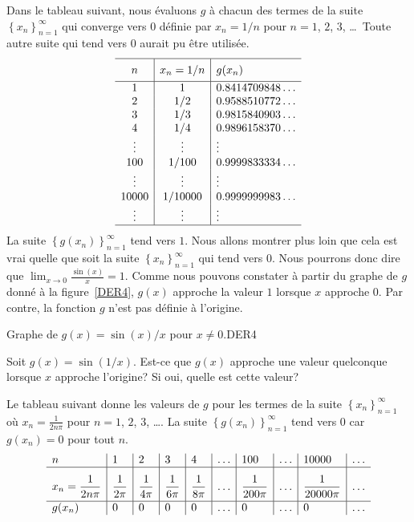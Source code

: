 {\begin{egg}
Dans le tableau suivant, nous évaluons $g$ à chacun des
termes de la suite $\displaystyle \left\{x_n\right\}_{n=1}^\infty$ qui
converge vers $0$ définie par $x_n = 1/n$ pour $n=1$, $2$, $3$,
\ldots\  Toute autre suite qui tend vers $0$ aurait pu être utilisée.
\[
\begin{array}{c|c|l}
\hline
\rule[-0.7em]{0ex}{2em} n & x_n = 1/n & g(x_n) \\
\hline
1 & 1 & 0.8414709848\ldots \\
2 & 1/2 & 0.9588510772\ldots \\
3 & 1/3 & 0.9815840903\ldots \\
4 & 1/4 & 0.9896158370\ldots \\
\vdots & \vdots & \vdots \\
100 & 1/100 & 0.9999833334\ldots \\
\vdots & \vdots & \vdots \\
10000 & 1/10000 & 0.9999999983\ldots \\
\vdots & \vdots & \vdots \\
\hline
\end{array}
\]
La suite $\displaystyle \left\{g(x_n)\right\}_{n=1}^\infty$
tend vers $1$.  Nous allons montrer plus loin que cela est vrai quelle que
soit la suite $\displaystyle \left\{x_n\right\}_{n=1}^\infty$ qui tend
vers $0$.  Nous pourrons donc dire que
$\displaystyle \lim_{x\rightarrow 0} \frac{\sin(x)}{x} = 1$.
Comme nous pouvons constater à partir du graphe de $g$ donné à la
figure~\ref{DER4}, $g(x)$ approche la valeur $1$ lorsque $x$ approche
$0$.  Par contre, la fonction $g$ n'est pas définie à l'origine.
\label{E_SINXX}
\end{egg}

{Graphe de $g(x) = \sin(x)/x$ pour $x\neq 0$.}{DER4}

\begin{egg}
Soit $g(x) = \sin(1/x)$.  Est-ce que $g(x)$ approche une valeur quelconque
lorsque $x$ approche l'origine?  Si oui, quelle est cette valeur?

Le tableau suivant donne les valeurs de $g$ pour les termes de la
suite $\displaystyle \left\{x_n\right\}_{n=1}^\infty$ où
$\displaystyle x_n = \frac{1}{2n \pi}$ pour $n=1$, $2$, $3$, \ldots.
La suite $\displaystyle \left\{g(x_n)\right\}_{n=1}^\infty$ tend
vers $0$ car $g(x_n) = 0$ pour tout $n$.
\[
\begin{array}{l|l|l|l|l|l|l|l|l|l}
n & 1 & 2 & 3 & 4 & \ldots & 100 & \ldots & 10000 & \ldots \\
\hline
\rule[-1em]{0ex}{3em} \displaystyle x_n = \frac{1}{2n \pi} &
\displaystyle \frac{1}{2\pi} & \displaystyle \frac{1}{4\pi} &
\displaystyle \frac{1}{6\pi} & \displaystyle \frac{1}{8\pi} &
\ldots & \displaystyle \frac{1}{200\pi} &
\ldots & \displaystyle \frac{1}{20000\pi} & \ldots \\
\hline
g(x_n) & 0 & 0 & 0 & 0 & \ldots & 0 & \ldots & 0 & \ldots
\end{array}
\]


\end{egg}}
